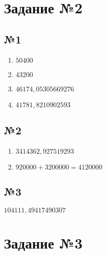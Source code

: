 \documentclass[a4paper, 12pt]{article}
\begin{document}
	\section{Задание №2}
	
	\subsection{№1}
	\begin{enumerate}
		\item $50 400$
		\item $43 200$
		\item $46 174,05305669276$
		\item $41 781,8210902593$
	\end{enumerate}
	\subsection{№2}
	\begin{enumerate}
		\item $3 414 362,927519293$
		\item $920 000 + 3 200 000 = 4 120 000$
	\end{enumerate}
	\subsection{№3}
	$104 111,49417490307$
	\section{Задание №3}
	
\end{document}
